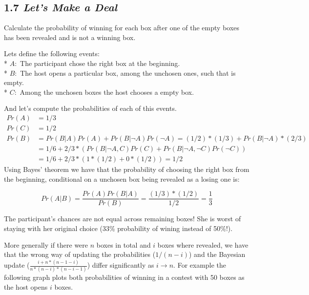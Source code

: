 \documentclass[]{article}
\begin{document}
\subsection{\texorpdfstring{1.7 \emph{Let's Make a
Deal}}{1.7 Let's Make a Deal}}\label{lets-make-a-deal}

Calculate the probability of winning for each box after one of the empty
boxes has been revealed and is not a winning box.

Lets define the following events:\\
* \(A:\) The participant chose the right box at the beginning.\\
* \(B:\) The host opens a particular box, among the unchosen ones, such
that is empty.\\
* \(C:\) Among the unchosen boxes the host chooses a empty box.

And let's compute the probabilities of each of this events.\\
\[
\begin{aligned}
Pr(A) &= 1/3\\
Pr(C) &= 1/2\\
Pr(B) &= Pr(B|A)Pr(A) + Pr(B|\neg A)Pr(\neg A) = (1/2)*(1/3) + Pr(B|\neg A)*(2/3)\\
      &= 1/6 + 2/3*(Pr(B|\neg A,C)Pr(C) + Pr(B|\neg A,\neg C)Pr(\neg C)) \\
      &= 1/6 + 2/3*(1*(1/2) + 0*(1/2)) = 1/2 
\end{aligned}  
\] Using Bayes' theorem we have that the probability of choosing the
right box from the beginning, conditional on a unchosen box being
revealed as a losing one is:

\[ Pr(A|B) = \frac{Pr(A)Pr(B|A)}{Pr(B)} = \frac{(1/3)*(1/2)}{1/2}=\frac{1}{3}\]

The participant's chances are not equal across remaining boxes! She is
worst of staying with her original choice (33\% probability of wining
instead of 50\%!).

More generally if there were \(n\) boxes in total and \(i\) boxes where
revealed, we have that the wrong way of updating the probabilities
(\(1/(n-i)\)) and the Bayesian update
(\(\frac{i+n*(n-1-i)}{n*(n-i)*(n-i-1)}\)) differ significantly as
\(i \rightarrow n\). For example the following graph plots both
probabilities of winning in a contest with 50 boxes as the host opens
\(i\) boxes.
\end{document}
